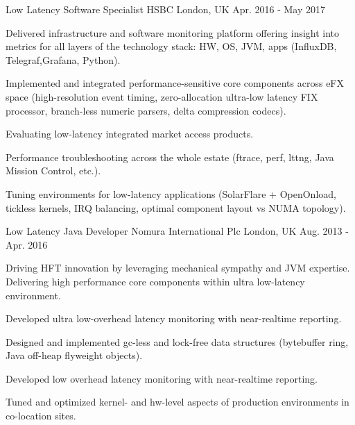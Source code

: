 \begin{cventries}
  \cventry
    {Low Latency Software Specialist} %
    {HSBC} %
    {London, UK} %
    {Apr. 2016 - May 2017} %
    {
      \begin{cvitems} %
        \item {Delivered infrastructure and software monitoring platform offering insight into metrics for all layers of the technology stack: HW, OS, JVM, apps (InfluxDB, Telegraf,Grafana, Python).}
        \item {Implemented and integrated performance-sensitive core components across eFX space (high-resolution event timing, zero-allocation ultra-low latency FIX processor, branch-less numeric parsers, delta compression codecs).}
        \item {Evaluating low-latency integrated market access products.}
        \item {Performance troubleshooting across the whole estate (ftrace, perf, lttng, Java Mission Control, etc.).}
        \item {Tuning environments for low-latency applications (SolarFlare + OpenOnload, tickless kernels, IRQ balancing, optimal component layout vs NUMA topology).}
      \end{cvitems}
    }

  \cventry
    {Low Latency Java Developer} %
    {Nomura International Plc} %
    {London, UK} %
    {Aug. 2013 - Apr. 2016} %
    {
      \begin{cvitems} %
        \item {Driving HFT innovation by leveraging mechanical sympathy and JVM expertise. Delivering high performance core components within ultra low-latency environment.}
        \item {Developed ultra low-overhead latency monitoring with near-realtime reporting.}
        \item {Designed and implemented gc-less and lock-free data structures (bytebuffer ring, Java off-heap flyweight objects).}
        \item {Developed low overhead latency monitoring with near-realtime reporting.}
        \item {Tuned and optimized kernel- and hw-level aspects of production environments in co-location sites.}
      \end{cvitems}
    }


\end{cventries}
